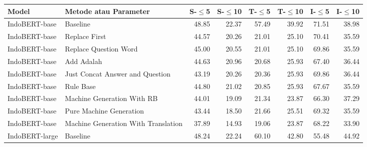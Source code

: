 \begin{table}[H]\centering
\scriptsize
\begin{tabular}{llrrrrrr}
\toprule
         Model &                Metode atau Parameter &  S-$\leq$5 &  S-$\leq$10 &  T-$\leq$5 &  T-$\leq$10 &  I-$\leq$5 &  I-$\leq$10 \\
\midrule
 IndoBERT-base &                            Baseline &                48.85 &                 22.37 &                57.49 &                 39.92 &                71.51 &                 38.98 \\
 IndoBERT-base &                       Replace First &                44.57 &                 20.26 &                21.01 &                 25.10 &                70.41 &                 35.59 \\
 IndoBERT-base &               Replace Question Word &                45.00 &                 20.55 &                21.01 &                 25.10 &                69.86 &                 35.59 \\
 IndoBERT-base &                          Add Adalah &                44.63 &                 20.96 &                20.68 &                 25.93 &                67.40 &                 36.44 \\
 IndoBERT-base &     Just Concat Answer and Question &                43.19 &                 20.26 &                20.36 &                 25.93 &                69.86 &                 36.44 \\
 IndoBERT-base &                           Rule Base &                44.80 &                 21.02 &                20.85 &                 25.93 &                67.67 &                 35.59 \\
 IndoBERT-base &          Machine Generation With RB &                44.01 &                 19.09 &                21.34 &                 23.87 &                66.30 &                 37.29 \\
 IndoBERT-base &             Pure Machine Generation &                43.44 &                 18.50 &                21.66 &                 25.51 &                69.32 &                 35.59 \\
 IndoBERT-base & Machine Generation With Translation &                37.89 &                 14.93 &                19.06 &                 23.87 &                68.22 &                 33.90 \\
\hline
IndoBERT-large &                            Baseline &                48.24 &                 22.24 &                60.10 &                 42.80 &                55.48 &                 44.92 \\

\end{tabular}
\end{table}
